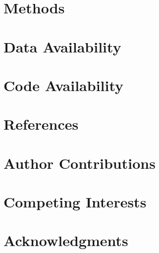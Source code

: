 \documentclass{article}
\begin{document}
\section{Methods}
\section{Data Availability}
\section{Code Availability}
\section{References}
\section{Author Contributions}
\section{Competing Interests}
\section{Acknowledgments}
\end{document}

